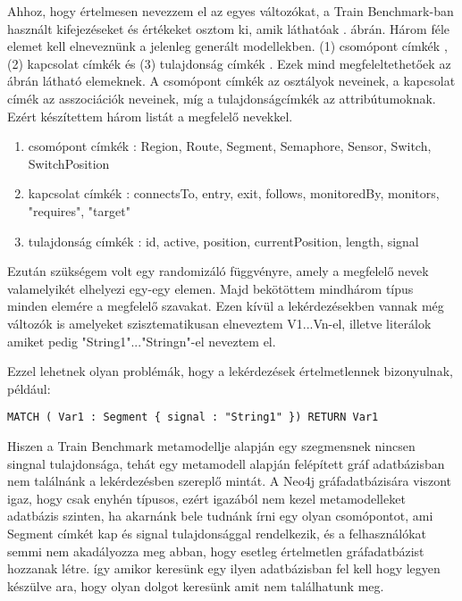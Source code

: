 Ahhoz, hogy értelmesen nevezzem el az egyes változókat, a Train Benchmark-ban használt kifejezéseket és értékeket osztom ki, amik láthatóak . ábrán. Három féle elemet kell elneveznünk a jelenleg generált modellekben. (1) csomópont címkék  , (2) kapcsolat címkék  és (3) tulajdonság címkék .
Ezek mind megfeleltethetőek az ábrán látható elemeknek. A csomópont címkék az osztályok neveinek, a kapcsolat címék az asszociációk neveinek, míg a tulajdonságcímkék az attribútumoknak. Ezért készítettem három listát a megfelelő nevekkel.
\begin{enumerate}
	\item csomópont címkék : Region, Route, Segment, Semaphore, Sensor, Switch, SwitchPosition
	\item kapcsolat címkék : connectsTo, entry, exit, follows, monitoredBy, monitors,
	"requires", "target"
	\item tulajdonság címkék : id, active, position, currentPosition, length, signal
	
\end{enumerate}
Ezután szükségem volt egy randomizáló függvényre, amely a megfelelő nevek valamelyikét elhelyezi egy-egy elemen.
Majd bekötöttem mindhárom típus minden elemére a megfelelő szavakat. Ezen kívül a lekérdezésekben vannak még változók is amelyeket szisztematikusan elneveztem V1...Vn-el, illetve literálok amiket pedig "String1"..."Stringn"-el neveztem el. 

Ezzel lehetnek olyan problémák, hogy a lekérdezések értelmetlennek bizonyulnak, például:
 \begin{lstlisting}[style=cyphersmall]
 MATCH ( Var1 : Segment { signal : "String1" }) RETURN Var1
 \end{lstlisting}
 
 Hiszen a Train Benchmark metamodellje alapján egy szegmensnek nincsen singnal tulajdonsága, tehát egy metamodell alapján felépített gráf adatbázisban nem találnánk a lekérdezésben szereplő mintát. A Neo4j gráfadatbázisára viszont igaz, hogy csak enyhén típusos, ezért igazából nem kezel metamodelleket adatbázis szinten, ha akarnánk bele tudnánk írni egy olyan csomópontot, ami Segment címkét kap és signal tulajdonsággal rendelkezik, és a felhasználókat semmi nem akadályozza meg abban, hogy esetleg értelmetlen gráfadatbázist hozzanak létre. így amikor keresünk egy ilyen adatbázisban fel kell hogy legyen készülve ara, hogy olyan dolgot keresünk amit nem találhatunk meg. 

